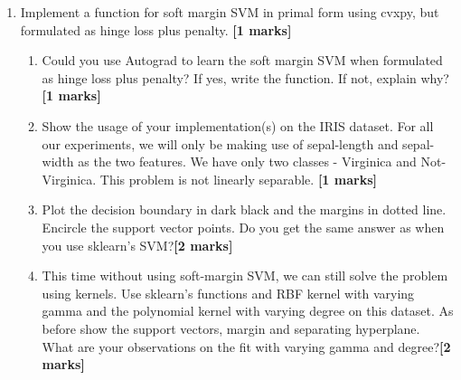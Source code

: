 \documentclass[colorlinks,linkcolor=true]{article}
\begin{document}
\begin{enumerate}
\begin{enumerate}
\item Implement a function for soft margin SVM in primal form using cvxpy, but formulated as hinge loss plus penalty. \textbf{[1 marks]}
\begin{enumerate}
	\item Could you use Autograd to learn the soft margin SVM when formulated as hinge loss plus penalty? If yes, write the function. If not, explain why? \textbf{[1 marks]}
	\item  Show the usage of your implementation(s) on the IRIS dataset. For all our experiments, we will only be making use of sepal-length and sepal-width as the two features. We have only two classes - Virginica and Not-Virginica. This problem is not linearly separable.  \textbf{[1 marks]}
	\item Plot the decision boundary in dark black and the margins in dotted line. Encircle the support vector points. Do you get the same answer as when you use sklearn's SVM?\textbf{[2 marks]}
	\item This time without using soft-margin SVM, we can still solve the problem using kernels. Use sklearn's functions and RBF kernel with varying gamma and the polynomial kernel with varying degree  on this dataset. As before show the support vectors, margin and separating hyperplane.  What are your observations on the fit with varying gamma and degree?\textbf{[2 marks]}
	
\end{enumerate}
\end{enumerate}
\end{enumerate}



	
\end{document}
